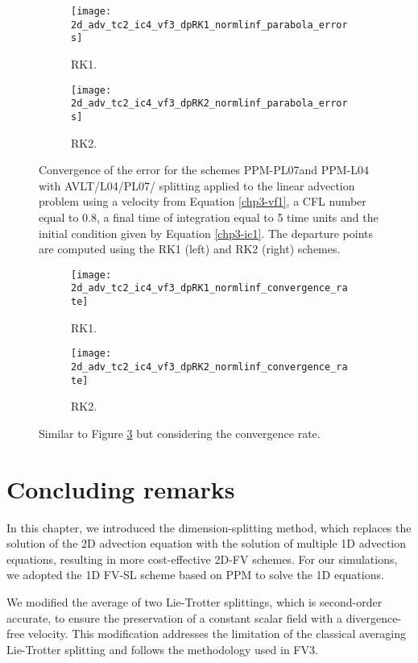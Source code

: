 \begin{figure}[!htb]
	\centering
	\begin{subfigure}{0.42\textwidth}
		\centering
		\texttt{[image: 2d\_adv\_tc2\_ic4\_vf3\_dpRK1\_normlinf\_parabola\_errors]}
		\caption{RK1.\label{chp3-sec-exp-adv2-error1}}
	\end{subfigure}
	\begin{subfigure}{0.42\textwidth}
		\centering
		\texttt{[image: 2d\_adv\_tc2\_ic4\_vf3\_dpRK2\_normlinf\_parabola\_errors]}
		\caption{RK2.\label{chp3-sec-exp-adv2-error2}}
	\end{subfigure}
	\caption{Convergence of the error for the schemes
	PPM-PL07and PPM-L04 with AVLT/L04/PL07/ splitting
	applied to the linear advection problem using a velocity from Equation \eqref{chp3-vf1},
	a CFL number equal to $0.8$, a final time of integration equal to 5 time units
	and the initial condition given by Equation \eqref{chp3-ic1}.
	The departure points are computed using the RK1 (left) and RK2 (right) schemes.\label{chp3-sec-exp-adv2-error}}
\end{figure}

\begin{figure}[!htb]
	\centering
	\begin{subfigure}{0.42\textwidth}
		\centering
		\texttt{[image: 2d\_adv\_tc2\_ic4\_vf3\_dpRK1\_normlinf\_convergence\_rate]}
		\caption{RK1.\label{chp3-sec-exp-adv2-cr1}}
	\end{subfigure}
	\begin{subfigure}{0.42\textwidth}
		\centering
		\texttt{[image: 2d\_adv\_tc2\_ic4\_vf3\_dpRK2\_normlinf\_convergence\_rate]}
		\caption{RK2.\label{chp3-sec-exp-adv2-cr2}}
	\end{subfigure}
	\caption{Similar to Figure \ref{chp3-sec-exp-adv2-error} but considering the convergence rate.\label{chp3-sec-exp-adv2-cr}}
\end{figure}

\section{Concluding remarks}
In this chapter, we introduced the dimension-splitting method, 
which replaces the solution of the 2D advection equation with the
solution of multiple 1D advection equations, resulting in more cost-effective 2D-FV schemes. 
For our simulations, we adopted the 1D FV-SL scheme based on PPM to solve the 1D equations.

We modified the average of two Lie-Trotter splittings, which is second-order accurate,
to ensure the preservation of a constant scalar field with a divergence-free velocity.
This modification addresses the limitation of the classical averaging
Lie-Trotter splitting and follows the methodology used in FV3.

